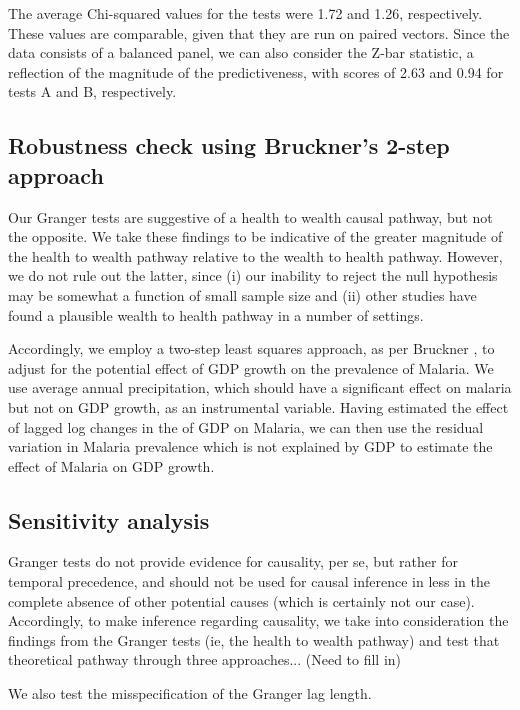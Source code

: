 \documentclass[9pt,twocolumn,twoside,lineno]{pnas-new}
\begin{document}
The average Chi-squared values for the tests were 1.72 and 1.26, respectively. These values are comparable, given that they are run on paired vectors. Since the data consists of a balanced panel, we can also consider the Z-bar statistic, a reflection of the magnitude of the predictiveness, with scores of 2.63 and 0.94 for tests A and B, respectively.


\subsection*{Robustness check using Bruckner's 2-step approach}

Our Granger tests are suggestive of a health to wealth causal pathway, but not the opposite. We take these findings to be indicative of the greater magnitude of the health to wealth pathway relative to the wealth to health pathway. However, we do not rule out the latter, since (i) our inability to reject the null hypothesis may be somewhat a function of small sample size and (ii) other studies have found a plausible wealth to health pathway in a number of settings.

Accordingly, we employ a two-step least squares approach, as per Bruckner \cite{bruckner2011}, to adjust for the potential effect of GDP growth on the prevalence of Malaria. We use average annual precipitation, which should have a significant effect on malaria but not on GDP growth, as an instrumental variable. Having estimated the effect of lagged log changes in the of GDP on Malaria, we can then use the residual variation in Malaria prevalence which is not explained by GDP to estimate the effect of Malaria on GDP growth.





\subsection*{Sensitivity analysis}


Granger tests do not provide evidence for causality, per se, but rather for temporal precedence, and should not be used for causal inference in less in the complete absence of other potential causes (which is certainly not our case). Accordingly, to make inference regarding causality, we take into consideration the findings from the Granger tests (ie, the health to wealth pathway) and test that theoretical pathway through three approaches... (Need to fill in)

We also test the misspecification of the Granger lag length.
\end{document}
